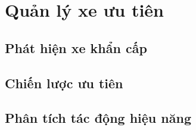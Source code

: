 \chapter{Quản lý xe ưu tiên}
\section{Phát hiện xe khẩn cấp}
\section{Chiến lược ưu tiên}
\section{Phân tích tác động hiệu năng}
